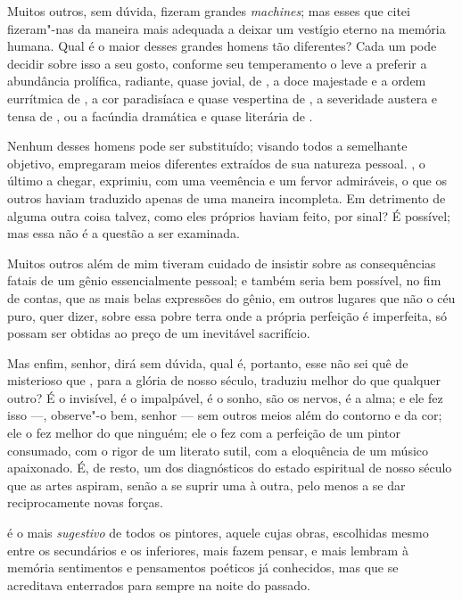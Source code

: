 Muitos outros, sem dúvida, fizeram grandes \textit{machines}; mas esses
que citei fizeram"-nas da maneira mais adequada a deixar um vestígio
eterno na memória humana. Qual é o maior desses grandes homens tão
diferentes? Cada um pode decidir sobre isso a seu gosto, conforme seu
temperamento o leve a preferir a abundância prolífica, radiante, quase
jovial, de , a doce majestade e a ordem eurrítmica de , a
cor paradisíaca e quase vespertina de , a severidade austera e
tensa de , ou a facúndia dramática e quase literária de .

Nenhum desses homens pode ser substituído; visando todos a semelhante
objetivo, empregaram meios diferentes extraídos de sua natureza
pessoal. , o último a chegar, exprimiu, com uma veemência e um
fervor admiráveis, o que os outros haviam traduzido apenas de uma
maneira incompleta. Em detrimento de alguma outra coisa talvez, como
eles próprios haviam feito, por sinal? É possível; mas essa não é a
questão a ser examinada.

Muitos outros além de mim tiveram cuidado de insistir sobre as
consequências fatais de um gênio essencialmente pessoal; e também seria
bem possível, no fim de contas, que as mais belas expressões do gênio,
em outros lugares que não o céu puro, quer dizer, sobre essa pobre
terra onde a própria perfeição é imperfeita, só possam ser obtidas ao
preço de um inevitável sacrifício.

Mas enfim, senhor, dirá sem dúvida, qual é, portanto, esse não sei quê
de misterioso que , para a glória de nosso século, traduziu
melhor do que qualquer outro? É o invisível, é o impalpável, é o sonho,
são os nervos, é a alma; e ele fez isso ---, observe"-o bem, senhor --- sem
outros meios além do contorno e da cor; ele o fez melhor do que
ninguém; ele o fez com a perfeição de um pintor consumado, com o rigor
de um literato sutil, com a eloquência de um músico apaixonado. É, de
resto, um dos diagnósticos do estado espiritual de nosso século que as
artes aspiram, senão a se suprir uma à outra, pelo menos a se dar
reciprocamente novas forças.

 é o mais \textit{sugestivo} de todos os pintores, aquele cujas
obras, escolhidas mesmo entre os secundários e os inferiores, mais
fazem pensar, e mais lembram à memória sentimentos e pensamentos
poéticos já conhecidos, mas que se acreditava enterrados para sempre na
noite do passado.

